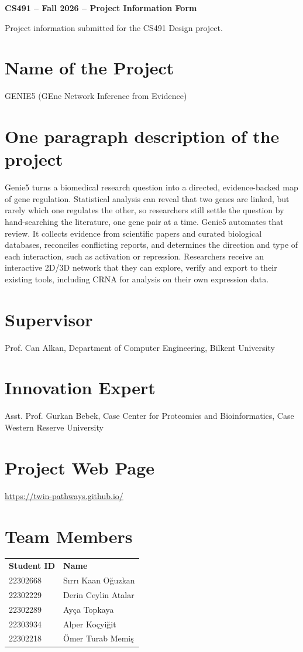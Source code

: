 \documentclass[11pt,a4paper]{article}
\begin{document}
{\LARGE\bfseries CS491 -- Fall 2026 -- Project Information Form\par}
\vspace{0.4em}
Project information submitted for the CS491 Design project.

\section*{Name of the Project}
GENIE5 (GEne Network Inference from Evidence)

\section*{One paragraph description of the project}
Genie5 turns a biomedical research question into a directed, evidence-backed map of gene regulation. Statistical analysis can reveal that two genes are linked, but rarely which one regulates the other, so researchers still settle the question by hand-searching the literature, one gene pair at a time. Genie5 automates that review. It collects evidence from scientific papers and curated biological databases, reconciles conflicting reports, and determines the direction and type of each interaction, such as activation or repression. Researchers receive an interactive 2D/3D network that they can explore, verify and export to their existing tools, including CRNA for analysis on their own expression data.

\section*{Supervisor}
Prof. Can Alkan, Department of Computer Engineering, Bilkent University

\section*{Innovation Expert}
Asst. Prof. Gurkan Bebek, Case Center for Proteomics and Bioinformatics, Case Western Reserve University

\section*{Project Web Page}
\url{https://twin-pathways.github.io/}

\section*{Team Members}
\begin{tabular}{@{}ll@{}}
\textbf{Student ID} & \textbf{Name} \\[0.3em]
22302668 & Sırrı Kaan Oğuzkan \\
22302229 & Derin Ceylin Atalar \\
22302289 & Ayça Topkaya \\
22303934 & Alper Koçyiğit \\
22302218 & Ömer Turab Memiş \\
\end{tabular}
\end{document}
